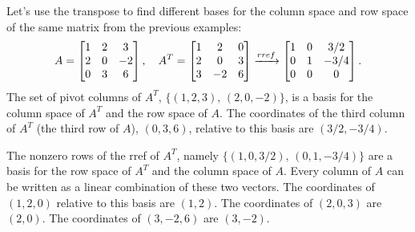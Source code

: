 \begin{example}\label{colspace2ex}
Let's use the transpose to find different bases for the column space and row space of the same matrix from the previous examples:  
$$
A=
\begin{bmatrix}
\begin{matrix} 1\\2\\0 \end{matrix}
&\begin{matrix} 2\\0\\3 \end{matrix}
&\begin{matrix} 3\\-2\\6 \end{matrix}
\end{bmatrix},\quad
A^T
=
\begin{bmatrix}
 1 & 2 & 0 \\
 2 & 0 & 3 \\
 3 & -2 & 6
\end{bmatrix}
\xrightarrow{rref}
\begin{bmatrix}
 1 & 0 & {3}/{2} \\
 0 & 1 & -{3}/{4} \\
 0 & 0 & 0
\end{bmatrix}.
$$
%
The set of pivot columns of $A^T$, $\{(1,2,3),\, (2,0,-2)\}$, is a basis for the column space of $A^T$ and the row space of $A$.
The coordinates of the third column of $A^T$ (the third row of $A$), $(0,3,6)$, relative to this basis are $(3/2,-3/4)$. 

The nonzero rows of the rref of $A^T$, namely $\{(1,0,3/2),\, (0,1,-3/4)\}$ are a basis for the row space of $A^T$ and the column space of $A$.  Every column of $A$ can be written as a linear combination of these two vectors. The coordinates of $(1,2,0)$ relative to this basis are $(1,2)$. The coordinates of $(2,0,3)$ are $(2,0)$. The coordinates of $(3,-2,6)$ are $(3,-2)$.
\end{example}

